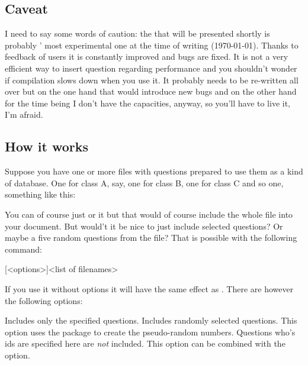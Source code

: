 \documentclass[DIV10,toc=index,toc=bib,numbers=noendperiod]{cnpkgdoc}
\begin{document}
\subsection{Caveat}
I need to say some words of caution: the  that will be
presented shortly is probably \ExSheets' most experimental one at the time of
writing (\today).  Thanks to feedback of users it is constantly improved and
bugs are fixed.  It is not a very efficient way to insert question regarding
performance and you shouldn't wonder if compilation slows down when you use
it.  It probably needs to be re-written all over but on the one hand that
would introduce new bugs and on the other hand for the time being I don't have
the capacities, anyway, so you'll have to live it, I'm afraid.

\subsection{How it works}
Suppose you have one or more files with questions prepared to use them as a
kind of database.  One for class A, say, one for class B, one for class C and
so one, something like this:
You can of course just  or  it but that would of
course include the whole file into your document.  But would't it be nice to
just include selected questions?  Or maybe a five random questions from the
file?  That is possible with the following command:
\begin{beschreibung}
  [<options>]{<list of filenames>}
\end{beschreibung}
If you use it without options it will have the same effect as
.  There are however the following options:
\begin{beschreibung}
  \Default{}
    Includes only the specified questions.
  \Default{}
    Includes  randomly selected questions.  This option uses the
     package to create the pseudo-random numbers.
  \Default{}
    Questions who's \acp{id} are specified here are \emph{not} included.  This
    option can be combined with the  option.
\end{beschreibung}
\end{document}
